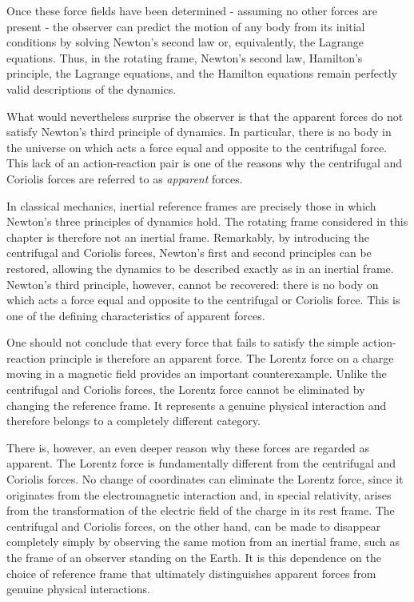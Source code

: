\documentclass[12pt]{article}
\begin{document}
Once these force fields have been determined - assuming no other forces are
present - the observer can predict the motion of any body from its initial
conditions by solving Newton's second law or, equivalently, the Lagrange
equations. Thus, in the rotating frame, Newton's second law, Hamilton's
principle, the Lagrange equations, and the Hamilton equations remain perfectly
valid descriptions of the dynamics. \par

What would nevertheless surprise the observer is that the apparent forces do
not satisfy Newton's third principle of dynamics. In particular, there is no
body in the universe on which acts a force equal and opposite to the
centrifugal force. This lack of an action-reaction pair is one of the reasons
why the centrifugal and Coriolis forces are referred to as \emph{apparent}
forces. \par

In classical mechanics, inertial reference frames are precisely those in
which Newton's three principles of dynamics hold. The rotating frame considered in this
chapter is therefore not an inertial frame. Remarkably, by introducing the centrifugal
and Coriolis forces, Newton's first and second principles can be restored, allowing
the dynamics to be described exactly as in an inertial frame. Newton's third principle,
however, cannot be recovered: there is no body on which acts a force equal and opposite to the centrifugal or Coriolis
force. This is one of the defining characteristics of apparent forces. \par

  One should not conclude that every force that fails to satisfy
  the simple action-reaction principle is therefore an apparent force.
   The Lorentz force on a charge moving in a magnetic field provides an important counterexample.
   Unlike the centrifugal and Coriolis forces, the Lorentz
  force cannot be eliminated by changing the reference frame. It represents a
   genuine physical interaction and therefore belongs to a completely different category. \par

There is, however, an even deeper reason why these forces are regarded as
apparent. The Lorentz force
 is fundamentally different from the centrifugal and Coriolis forces. No
change of coordinates can eliminate the Lorentz force, since it originates from
the electromagnetic interaction and, in special relativity, arises from the
transformation of the electric field of the charge in its rest frame. The
centrifugal and Coriolis forces, on the other hand, can be made to disappear
completely simply by observing the same motion from an inertial frame, such as
the frame of an observer standing on the Earth. It is this dependence on the
choice of reference frame that ultimately distinguishes apparent forces from
genuine physical interactions.
\end{document}
